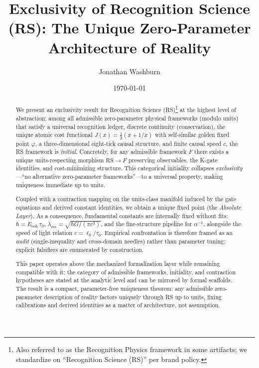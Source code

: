 \documentclass[11pt]{article}
\title{Exclusivity of Recognition Science (RS): The Unique Zero\mbox{-}Parameter Architecture of Reality}
\author{Jonathan Washburn}
\date{\today}
\begin{document}
\maketitle

\begin{abstract}
We present an exclusivity result for Recognition Science (RS)\footnote{Also referred to as the Recognition Physics framework in some artifacts; we standardize on “Recognition Science (RS)” per brand policy.} at the highest level of abstraction: among all admissible zero\mbox{-}parameter physical frameworks (modulo units) that satisfy a universal recognition ledger, discrete continuity (conservation), the unique atomic cost functional \(J(x)=\tfrac{1}{2}(x+1/x)\) with self\mbox{-}similar golden fixed point \(\varphi\), a three\mbox{-}dimensional eight\mbox{-}tick causal structure, and finite causal speed \(c\), the RS framework is \emph{initial}. Concretely, for any admissible framework \(F\) there exists a unique units\mbox{-}respecting morphism \(\mathrm{RS}\to F\) preserving observables, the K\mbox{-}gate identities, and cost\mbox{-}minimizing structure. This categorical initiality collapses \emph{exclusivity}---``no alternative zero\mbox{-}parameter frameworks''---to a universal property, making uniqueness immediate up to units.

Coupled with a contraction mapping on the units\mbox{-}class manifold induced by the gate equations and derived constant identities, we obtain a unique fixed point (the \emph{Absolute Layer}). As a consequence, fundamental constants are internally fixed without fits: \(\hbar = E_{\mathrm{coh}}\,\tau_0\), \(\lambda_{\mathrm{rec}} = \sqrt{\hbar G/(\pi c^3)}\), and the fine\mbox{-}structure pipeline for \(\alpha^{-1}\), alongside the speed of light relation \(c=\ell_0/\tau_0\). Empirical confrontation is therefore framed as an \emph{audit} (single\mbox{-}inequality and cross\mbox{-}domain needles) rather than parameter tuning; explicit falsifiers are enumerated by construction.

This paper operates above the mechanized formalization layer while remaining compatible with it: the category of admissible frameworks, initiality, and contraction hypotheses are stated at the analytic level and can be mirrored by formal scaffolds. The result is a compact, parameter\mbox{-}free uniqueness theorem: any admissible zero\mbox{-}parameter description of reality factors uniquely through RS up to units, fixing calibrations and derived identities as a matter of architecture, not assumption.
\end{abstract}
\end{document}
